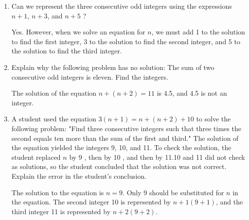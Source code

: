 \documentclass{ximera}
\begin{document}
\begin{enumerate}
\begin{enumerate}
\item Can we represent the three consecutive odd integers using the expressions $n+1$, $n+3$, and $n+5$ ?
\begin{solution}
Yes. However, when we solve an equation for $n$, we must add 1 to the solution to find the first integer, 3 to the solution to find the second integer, and 5 to the solution to find the third integer.
\end{solution}
  \item Explain why the following problem has no solution: The sum of two consecutive odd integers is eleven. Find the integers.
\begin{solution}
The solution of the equation $n+(n+2)=11$ is 4.5, and 4.5 is not an integer.
\end{solution}
  \item A student used the equation $3(n+1)= n+(n+2)+10$ to solve the following problem: "Find three consecutive integers such that three times the second equals ten more than the sum of the first and third." The solution of the equation yielded the integers 9, 10, and 11. To check the solution, the student replaced $n$ by 9 , then by 10 , and then by 11.10 and 11 did not check as solutions, so the student concluded that the solution was not correct. Explain the error in the student's conclusion.
\begin{solution}
The solution to the equation is $n=9$. Only 9 should be substituted for $n$ in the equation. The second integer 10 is represented by $n+1(9+1)$, and the third integer 11 is represented by $n+2(9+2)$.
\end{solution}
  \end{enumerate}
\end{enumerate}
\end{document}

